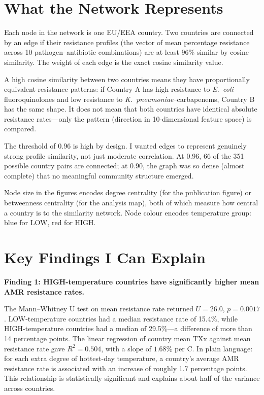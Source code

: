 \documentclass[12pt,a4paper]{article}
\begin{document}
\section{What the Network Represents}

Each node in the network is one EU/EEA country.
Two countries are connected by an edge if their resistance profiles
(the vector of mean percentage resistance across 10 pathogen--antibiotic
combinations) are at least 96\% similar by cosine similarity.
The weight of each edge is the exact cosine similarity value.

A high cosine similarity between two countries means they have
proportionally equivalent resistance patterns: if Country A has high
resistance to \textit{E.\ coli}--fluoroquinolones and low resistance to
\textit{K.\ pneumoniae}--carbapenems, Country B has the same shape.
It does not mean that both countries have identical absolute resistance
rates---only the pattern (direction in 10-dimensional feature space) is
compared.

The threshold of 0.96 is high by design.
I wanted edges to represent genuinely strong profile similarity, not just
moderate correlation.
At 0.96, 66 of the 351 possible country pairs are connected; at 0.90,
the graph was so dense (almost complete) that no meaningful community
structure emerged.

Node size in the figures encodes degree centrality (for the publication
figure) or betweenness centrality (for the analysis map), both of which
measure how central a country is to the similarity network.
Node colour encodes temperature group: blue for LOW, red for HIGH.

\section{Key Findings I Can Explain}

\textbf{Finding 1: HIGH-temperature countries have significantly higher
mean AMR resistance rates.}

The Mann--Whitney U test on mean resistance rate returned
$U = 26.0$, $p = 0.0017$.
LOW-temperature countries had a median resistance rate of 15.4\%,
while HIGH-temperature countries had a median of 29.5\%---a difference
of more than 14 percentage points.
The linear regression of country mean TXx against mean resistance rate
gave $R^2 = 0.504$, with a slope of $1.68\%$ per \textdegree{}C.
In plain language: for each extra degree of hottest-day temperature,
a country's average AMR resistance rate is associated with an increase
of roughly 1.7 percentage points.
This relationship is statistically significant and explains about half
of the variance across countries.
\end{document}

